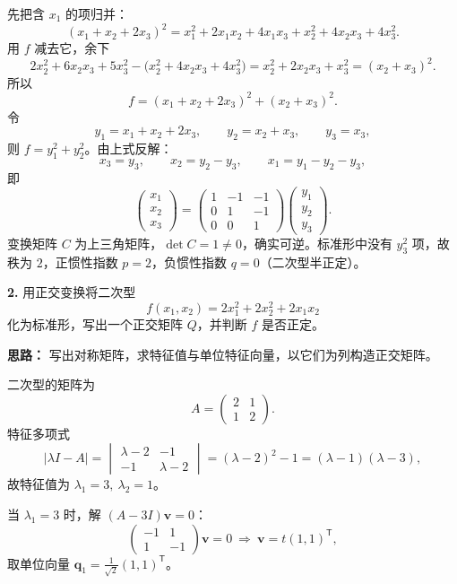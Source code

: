 先把含 \(x_1\) 的项归并：
\[
(x_1+x_2+2x_3)^2=x_1^2+2x_1x_2+4x_1x_3+x_2^2+4x_2x_3+4x_3^2.
\]
用 \(f\) 减去它，余下
\[
2x_2^2+6x_2x_3+5x_3^2-\bigl(x_2^2+4x_2x_3+4x_3^2\bigr)
=x_2^2+2x_2x_3+x_3^2=(x_2+x_3)^2.
\]
所以
\[
f=(x_1+x_2+2x_3)^2+(x_2+x_3)^2.
\]
令
\[
y_1=x_1+x_2+2x_3,\qquad y_2=x_2+x_3,\qquad y_3=x_3,
\]
则 \(f=y_1^2+y_2^2\)。由上式反解：
\[
x_3=y_3,\qquad x_2=y_2-y_3,\qquad x_1=y_1-y_2-y_3,
\]
即
\[
\begin{pmatrix}x_1\\x_2\\x_3\end{pmatrix}
=\begin{pmatrix}
1&-1&-1\\
0&1&-1\\
0&0&1
\end{pmatrix}
\begin{pmatrix}y_1\\y_2\\y_3\end{pmatrix}.
\]
变换矩阵 \(C\) 为上三角矩阵，\(\det C=1\neq0\)，确实可逆。标准形中没有 \(y_3^2\) 项，故秩为 \(2\)，正惯性指数 \(p=2\)，负惯性指数 \(q=0\)（二次型半正定）。

\else \answerarea[8] \fi%

\textbf{2.} 用正交变换将二次型
\[
f(x_1,x_2)=2x_1^2+2x_2^2+2x_1x_2
\]
化为标准形，写出一个正交矩阵 \(Q\)，并判断 \(f\) 是否正定。

\ifshowsolutions%

\textbf{思路：} 写出对称矩阵，求特征值与单位特征向量，以它们为列构造正交矩阵。

二次型的矩阵为
\[
A=\begin{pmatrix}2&1\\1&2\end{pmatrix}.
\]
特征多项式
\[
|\lambda I-A|=\begin{vmatrix}\lambda-2&-1\\-1&\lambda-2\end{vmatrix}
=(\lambda-2)^2-1=(\lambda-1)(\lambda-3),
\]
故特征值为 \(\lambda_1=3,\ \lambda_2=1\)。

当 \(\lambda_1=3\) 时，解 \((A-3I)\mathbf{v}=0\)：
\[
\begin{pmatrix}-1&1\\1&-1\end{pmatrix}\mathbf{v}=0
\ \Longrightarrow\ \mathbf{v}=t(1,1)^{\mathsf T},
\]
取单位向量 \(\mathbf{q}_1=\frac1{\sqrt2}(1,1)^{\mathsf T}\)。

